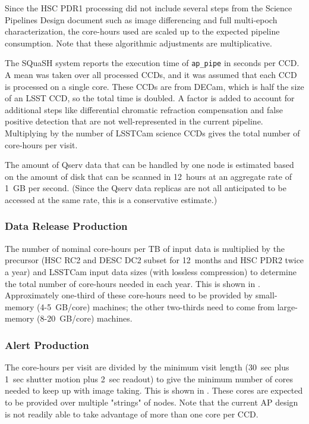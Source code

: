 Since the HSC PDR1 processing did not include several steps from the Science Pipelines Design document  such as image differencing and full multi-epoch characterization, the core-hours used are scaled up to the expected pipeline consumption.
Note that these algorithmic adjustments are multiplicative.

The SQuaSH system reports the execution time of \texttt{ap\_pipe} in seconds per CCD.
A mean was taken over all processed CCDs, and it was assumed that each CCD is processed on a single core.
These CCDs are from DECam, which is half the size of an LSST CCD, so the total time is doubled.
A factor is added to account for additional steps like differential chromatic refraction compensation and false positive detection that are not well-represented in the current pipeline.
Multiplying by the number of LSSTCam science CCDs gives the total number of core-hours per visit.

The amount of Qserv data that can be handled by one node is estimated based on the amount of disk that can be scanned in 12~hours at an aggregate rate of 1~GB per second.
(Since the Qserv data replicas are not all anticipated to be accessed at the same rate, this is a conservative estimate.)

\subsubsection{Data Release Production}

The number of nominal core-hours per TB of input data is multiplied by the precursor (HSC RC2 and DESC DC2 subset for 12~months and HSC PDR2 twice a year) and LSSTCam input data sizes (with lossless compression) to determine the total number of core-hours needed in each year.
This is shown in .
Approximately one-third of these core-hours need to be provided by small-memory (4-5~GB/core) machines; the other two-thirds need to come from large-memory (8-20~GB/core) machines.



\subsubsection{Alert Production}

The core-hours per visit are divided by the minimum visit length (30~sec plus 1~sec shutter motion plus 2~sec readout) to give the minimum number of cores needed to keep up with image taking.
This is shown in .
These cores are expected to be provided over multiple "strings" of nodes.
Note that the current AP design is not readily able to take advantage of more than one core per CCD.

